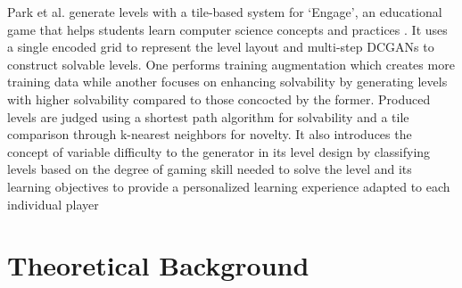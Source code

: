 \documentclass{Configuration_Files/PoliMi3i_thesis}
\begin{document}
Park et al. generate levels with a tile-based system for ‘Engage’, an educational game 
that helps students learn computer science concepts and practices \cite{KyP19}. It uses a single 
encoded grid to represent the level layout and multi-step DCGANs to construct
solvable levels. One performs training augmentation which creates more training 
data while another focuses on enhancing solvability by generating levels with higher 
solvability compared to those concocted by the former. Produced levels are judged 
using a shortest path algorithm for solvability and a tile comparison through k-nearest 
neighbors for novelty. It also introduces the concept of variable difficulty to 
the generator in its level design by classifying levels based on the degree of gaming 
skill needed to solve the level and its learning objectives to provide a personalized 
learning experience adapted to each individual player
\newpage

\section{Theoretical Background}
\end{document}
